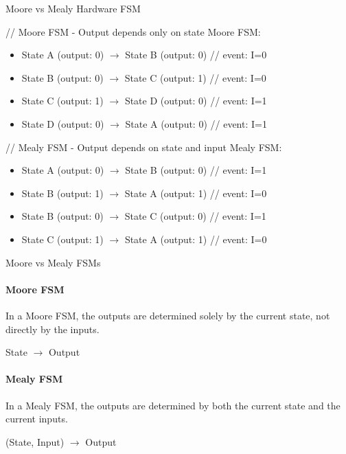 \begin{example2}{Moore vs Mealy Hardware FSM}

// Moore FSM - Output depends only on state
Moore FSM:
\begin{itemize}
    \item State A (output: 0) $\rightarrow$ State B (output: 0)  // event: I=0
    \item State B (output: 0) $\rightarrow$ State C (output: 1)  // event: I=0
    \item State C (output: 1) $\rightarrow$ State D (output: 0)  // event: I=1
    \item State D (output: 0) $\rightarrow$ State A (output: 0)  // event: I=1
\end{itemize}

// Mealy FSM - Output depends on state and input
Mealy FSM:
\begin{itemize}
    \item State A (output: 0) $\rightarrow$ State B (output: 0)  // event: I=1
    \item State B (output: 1) $\rightarrow$ State A (output: 1)  // event: I=0
    \item State B (output: 0) $\rightarrow$ State C (output: 0)  // event: I=1
    \item State C (output: 1) $\rightarrow$ State A (output: 1)  // event: I=0
\end{itemize}
\end{example2}

\begin{definition}{Moore vs Mealy FSMs}
\paragraph{Moore FSM}
In a Moore FSM, the outputs are determined solely by the current state, not directly by the inputs.
\begin{center}
State $\rightarrow$ Output
\end{center}

\paragraph{Mealy FSM}
In a Mealy FSM, the outputs are determined by both the current state and the current inputs.
\begin{center}
(State, Input) $\rightarrow$ Output
\end{center}
\end{definition}

